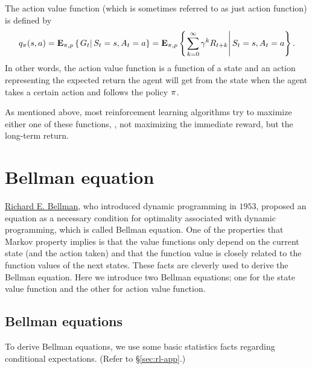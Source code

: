 The action value function (which is sometimes referred to as just action function) is defined by
\begin{equation}
q_{\pi}(s, a)
= \mathbf{E}_{\pi,p} \left\{\left.G_{t}\right|S_{t} = s, A_t = a\right\}
= \mathbf{E}_{\pi,p} \left\{\left.
    \sum_{k=0}^\infty \gamma^k R_{t+k}
    \right|S_{t} = s, A_t = a\right\}.
\end{equation}
In other words, the action value function is a function of a state and an action
representing the expected return the agent will get from the state when the agent takes a certain action
and follows the policy $\pi$.

As mentioned above, most reinforcement learning algorithms try to maximize either one of these functions,
\ie,
not maximizing the immediate reward, but the long-term return.

\section{Bellman equation}

\href{https://en.wikipedia.org/wiki/Richard_E._Bellman}{Richard E. Bellman}, who introduced dynamic programming in $1953$,
proposed an equation as a necessary condition for optimality associated with dynamic programming,
which is called Bellman equation.
One of the properties that Markov property implies is that the value functions only depend on the current state (and the action taken)
and that the function value is closely related to the function values of the next states.
These facts are cleverly used to derive the Bellman equation.
Here we introduce two Bellman equations; one for the state value function and the other for action value function.


\subsection{Bellman equations}

To derive Bellman equations, we use some basic statistics facts regarding conditional expectations.
(Refer to \S\ref{sec:rl-app}.)

